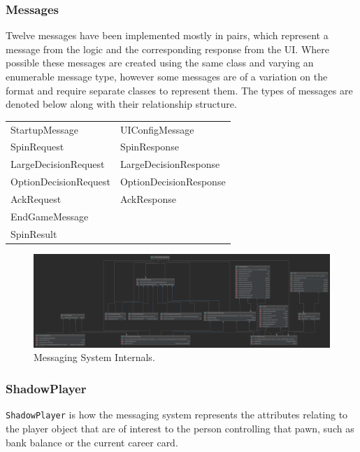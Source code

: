 \documentclass[a4paper, 11pt]{article}
\begin{document}
	\subsubsection*{Messages}
	Twelve messages have been implemented mostly in pairs, which represent a message from the logic and the corresponding response from the UI. Where possible these messages are created using the same class and varying an enumerable message type, however some messages are of a variation on the format and require separate classes to represent them. The types of messages are denoted below along with their relationship structure.
	\begin{table}[!ht]
		\begin{center} 
			\begin{tabular}{ll} 
				StartupMessage&UIConfigMessage\\
				SpinRequest&SpinResponse\\
				LargeDecisionRequest&LargeDecisionResponse\\
				OptionDecisionRequest&OptionDecisionResponse\\
				AckRequest&AckResponse\\
				EndGameMessage&\\
				SpinResult&\\	
			\end{tabular}
		\end{center}
	\end{table}
	\begin{figure}[H]
		\centering
		\includegraphics[scale=.125]{uml/messaging_internals_uml}
		\caption{Messaging System Internals.}
		\label{fig:messages_uml}
	\end{figure}
	\subsubsection*{ShadowPlayer}
	\texttt{ShadowPlayer} is how the messaging system represents the attributes relating to the player object that are of interest to the person controlling that pawn, such as bank balance or the current career card.
	
\end{document}

